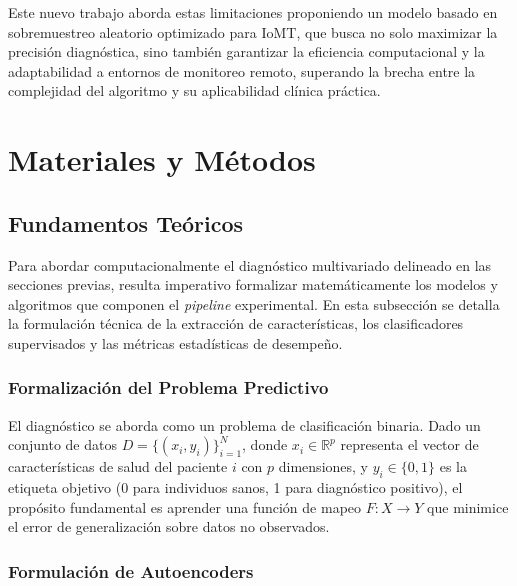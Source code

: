 \documentclass[journal]{IEEEtran}
\begin{document}
Este nuevo trabajo aborda estas limitaciones proponiendo un modelo basado en sobremuestreo aleatorio optimizado para IoMT, que busca no solo maximizar la precisión diagnóstica, sino también garantizar la eficiencia computacional y la adaptabilidad a entornos de monitoreo remoto, superando la brecha entre la complejidad del algoritmo y su aplicabilidad clínica práctica.
\section{Materiales y Métodos}

\subsection{Fundamentos Teóricos}

Para abordar computacionalmente el diagnóstico multivariado delineado en las secciones previas, resulta imperativo formalizar matemáticamente los modelos y algoritmos que componen el \textit{pipeline} experimental. En esta subsección se detalla la formulación técnica de la extracción de características, los clasificadores supervisados y las métricas estadísticas de desempeño.

\subsubsection{Formalización del Problema Predictivo}

El diagnóstico se aborda como un problema de clasificación binaria. Dado un conjunto de datos $D = \{(x_i, y_i)\}_{i=1}^{N}$, donde $x_i \in \mathbb{R}^p$ representa el vector de características de salud del paciente $i$ con $p$ dimensiones, y $y_i \in \{0, 1\}$ es la etiqueta objetivo (0 para individuos sanos, 1 para diagnóstico positivo), el propósito fundamental es aprender una función de mapeo $F: X \rightarrow Y$ que minimice el error de generalización sobre datos no observados.

\subsubsection{Formulación de Autoencoders}
\end{document}
